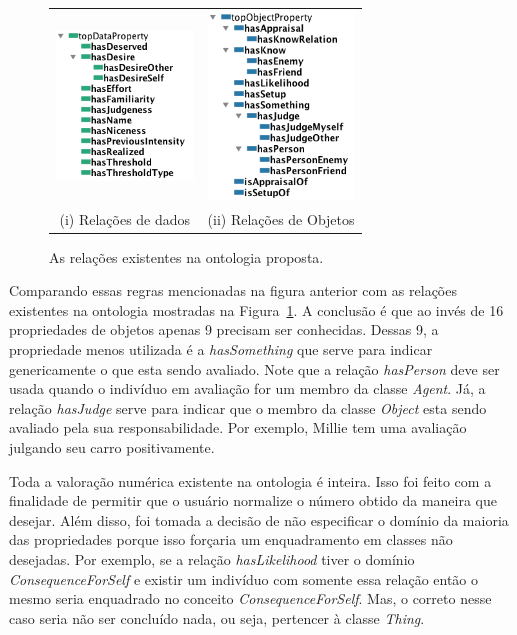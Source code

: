 \begin{figure}[b]
  \centering
  \begin{tabular}{cc}
  \includegraphics[height=4cm]{figuras/dataProperty-LOCC.png} & \includegraphics[height=5cm]{figuras/objectProperty-LOCC.png} \\
  (i) Relações de dados & (ii) Relações de Objetos
  \end{tabular}
  \caption{As relações existentes na ontologia proposta.}
  \label{fig:kplocc}
\end{figure}

Comparando essas regras mencionadas na figura anterior com as relações
existentes na ontologia mostradas na Figura~\ref{fig:kplocc}. A conclusão é
que ao invés de 16 propriedades de objetos apenas 9 precisam ser conhecidas.
Dessas 9, a propriedade menos utilizada é a \emph{hasSomething} que serve para
indicar genericamente o que esta sendo avaliado. Note que a relação
\emph{hasPerson} deve ser usada quando o indivíduo em avaliação for um membro
da classe \emph{Agent}. Já, a relação \emph{hasJudge} serve para indicar que o
membro da classe \emph{Object} esta sendo avaliado pela sua responsabilidade.
Por exemplo, Millie tem uma avaliação julgando seu carro positivamente.

Toda a valoração numérica existente na ontologia é inteira. Isso foi feito com a
finalidade de permitir que o usuário normalize\dev{} o número obtido da
maneira que desejar. Além disso, foi tomada a decisão de não especificar o
domínio da maioria das propriedades porque isso forçaria um
enquadramento em classes não desejadas. Por exemplo, se a relação
\emph{hasLikelihood} tiver o domínio \emph{ConsequenceForSelf} e existir um
indivíduo com somente essa relação então o mesmo seria enquadrado no conceito
\emph{ConsequenceForSelf}. Mas, o correto nesse caso seria não ser concluído nada,
ou seja, pertencer à classe \emph{Thing}.


